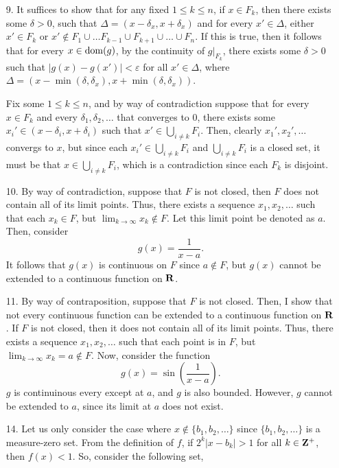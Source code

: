 \documentclass{article}
\newcommand{\eps}{\varepsilon}
\theoremstyle{remark}
\begin{document}
\begin{enumerate}[leftmargin=*]
    \item[9.] It suffices to show that for any fixed $1 \leq k \leq n$, if $x \in F_k$, then there exists 
    some $\delta > 0$, such that $\Delta = (x-\delta_x, x + \delta_x)$ and for every $x' \in \Delta$, 
    either $x' \in F_k$ or $x' \notin F_1 \cup \ldots F_{k-1} \cup F_{k+1} \cup \ldots \cup F_n$. If this is true,
    then it follows that for every $x \in \operatorname*{dom}(g)$, by the continuity of $g|_{F_k}$, there exists some $\delta > 0$
    such that $|g(x) - g(x')| < \eps$ for all $x' \in \Delta$, where $\Delta = (x - \min(\delta, \delta_x), x + \min(\delta, \delta_x))$.

    Fix some $1 \leq k \leq n$, and by way of contradiction suppose that for every $x\in F_k$ and every
    $\delta_1, \delta_2,\ldots$ that converges to 0, there exists some $x_i' \in (x-\delta_i, x+\delta_i)$ 
    such that $x' \in \bigcup_{i\neq k} F_i $. Then, clearly $x_1', x_2',\ldots$ convergs to $x$, but since 
    each $x_i' \in \bigcup_{i\neq k} F_i$ and $\bigcup_{i\neq k} F_i$ is a closed set, it must be that 
    $x \in \bigcup_{i\neq k} F_i$, which is a contradiction since each $F_k$ is disjoint. 
    \item[10.] By way of contradiction, suppose that $F$ is not closed, then $F$ does not contain
    all of its limit points. Thus, there exists a sequence $x_1, x_2, \ldots$ such that each $x_k \in F$,
    but $\lim_{k\to\infty} x_k \notin F$. Let this limit point be denoted as $a$. Then, consider 
    \[
        g(x) = \frac{1}{x - a}.    
    \]
    It follows that $g(x)$ is continuous on $F$ since $a\notin F$, but $g(x)$ cannot be extended to a 
    continuous function on $\mathbf{R}$. 
    \item[11.] By way of contraposition, suppose that $F$ is not closed. Then, I show that 
    not every continuous function can be extended to a continuous function on $\mathbf{R}$. If $F$ is not closed, then 
    it does not contain all of its limit points. Thus, there exists a sequence $x_1, x_2, \ldots$ such that 
    each point is in $F$, but $\lim_{k\to\infty} x_k = a\notin F$. Now, consider the function 
    \[
        g(x) = \sin\left(\frac{1}{x-a}\right).
    \]
    $g$ is continuinous every except at $a$, and $g$ is also bounded. However, $g$ cannot be extended to $a$, 
    since its limit at $a$ does not exist.
    \item[14.] Let us only consider the case where $x \notin \{b_1,b_2,\ldots\}$ since $\{b_1,b_2,\ldots\}$ is a measure-zero set.
    From the definition of $f$, if $2^k|x -b_k| > 1$ for all $k \in \mathbf{Z}^+$, then $f(x) < 1$. So, consider the following set,

\end{enumerate}
\end{document}
